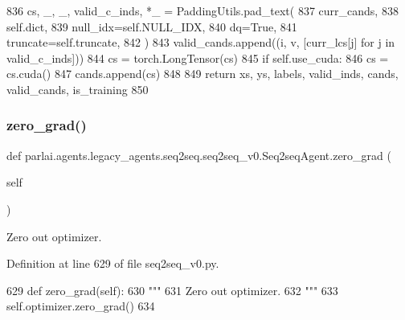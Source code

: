 \begin{DoxyCode}
836                     cs, \_, \_, valid\_c\_inds, *\_ = PaddingUtils.pad\_text(
837                         curr\_cands,
838                         self.dict,
839                         null\_idx=self.NULL\_IDX,
840                         dq=\textcolor{keyword}{True},
841                         truncate=self.truncate,
842                     )
843                     valid\_cands.append((i, v, [curr\_lcs[j] \textcolor{keywordflow}{for} j \textcolor{keywordflow}{in} valid\_c\_inds]))
844                     cs = torch.LongTensor(cs)
845                     \textcolor{keywordflow}{if} self.use\_cuda:
846                         cs = cs.cuda()
847                     cands.append(cs)
848 
849         \textcolor{keywordflow}{return} xs, ys, labels, valid\_inds, cands, valid\_cands, is\_training
850 
\end{DoxyCode}
\mbox{\label{classparlai_1_1agents_1_1legacy__agents_1_1seq2seq_1_1seq2seq__v0_1_1Seq2seqAgent_a0be9f1e378a403284d8afac5648fbf4d}} 
\subsubsection{\texorpdfstring{zero\+\_\+grad()}{zero\_grad()}}
{\footnotesize\ttfamily def parlai.\+agents.\+legacy\+\_\+agents.\+seq2seq.\+seq2seq\+\_\+v0.\+Seq2seq\+Agent.\+zero\+\_\+grad (\begin{DoxyParamCaption}\item[{}]{self }\end{DoxyParamCaption})}

\begin{DoxyVerb}Zero out optimizer.
\end{DoxyVerb}
 

Definition at line 629 of file seq2seq\+\_\+v0.\+py.


\begin{DoxyCode}
629     \textcolor{keyword}{def }zero\_grad(self):
630         \textcolor{stringliteral}{"""}
631 \textcolor{stringliteral}{        Zero out optimizer.}
632 \textcolor{stringliteral}{        """}
633         self.optimizer.zero\_grad()
634 
\end{DoxyCode}


